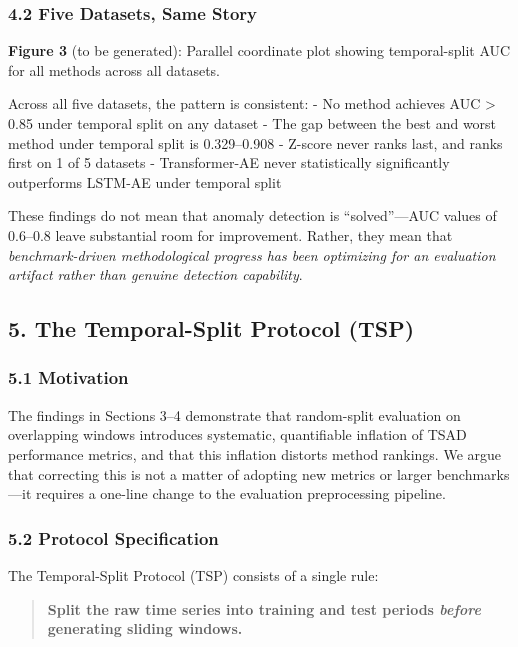 \documentclass[
]{article}
\begin{document}
\subsubsection{4.2 Five Datasets, Same
Story}\label{five-datasets-same-story}

\textbf{Figure 3} (to be generated): Parallel coordinate plot showing
temporal-split AUC for all methods across all datasets.

Across all five datasets, the pattern is consistent: - No method
achieves AUC \textgreater{} 0.85 under temporal split on any dataset -
The gap between the best and worst method under temporal split is
0.329--0.908 - Z-score never ranks last, and ranks first on 1 of 5
datasets - Transformer-AE never statistically significantly outperforms
LSTM-AE under temporal split

These findings do not mean that anomaly detection is ``solved''---AUC
values of 0.6--0.8 leave substantial room for improvement. Rather, they
mean that \emph{benchmark-driven methodological progress has been
optimizing for an evaluation artifact rather than genuine detection
capability}.

\subsection{5. The Temporal-Split Protocol
(TSP)}\label{the-temporal-split-protocol-tsp}

\subsubsection{5.1 Motivation}\label{motivation}

The findings in Sections 3--4 demonstrate that random-split evaluation
on overlapping windows introduces systematic, quantifiable inflation of
TSAD performance metrics, and that this inflation distorts method
rankings. We argue that correcting this is not a matter of adopting new
metrics or larger benchmarks---it requires a one-line change to the
evaluation preprocessing pipeline.

\subsubsection{5.2 Protocol Specification}\label{protocol-specification}

The Temporal-Split Protocol (TSP) consists of a single rule:

\begin{quote}
\textbf{Split the raw time series into training and test periods
\emph{before} generating sliding windows.}
\end{quote}
\end{document}
